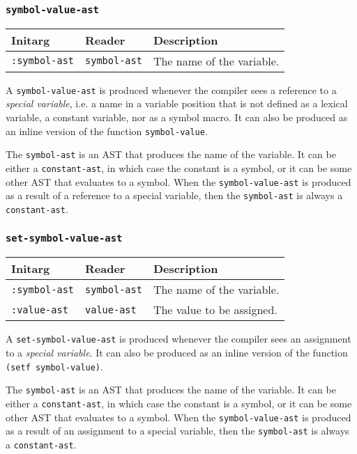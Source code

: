 \subsubsection{\texttt{symbol-value-ast}}
\label{symbol-value-ast}

\begin{tabular}{|l|l|l|}
\hline
Initarg & Reader & Description\\
\hline\hline
\texttt{:symbol-ast} & \texttt{symbol-ast} & The name of the variable.\\  
\hline
\end{tabular}

A \texttt{symbol-value-ast} is produced whenever the compiler sees a
reference to a \emph{special variable}, i.e. a name in a variable
position that is not defined as a lexical variable, a constant
variable, nor as a symbol macro.  It can also be produced as an inline
version of the function \texttt{symbol-value}.

The \texttt{symbol-ast} is an AST that produces the name of the
variable.  It can be either a \texttt{constant-ast}, in which case the
constant is a symbol, or it can be some other AST that evaluates to a
symbol.  When the \texttt{symbol-value-ast} is produced as a result of
a reference to a special variable, then the \texttt{symbol-ast} is
always a \texttt{constant-ast}.

\subsubsection{\texttt{set-symbol-value-ast}}
\label{set-symbol-value-ast}

\begin{tabular}{|l|l|l|}
\hline
Initarg & Reader & Description\\
\hline\hline
\texttt{:symbol-ast} & \texttt{symbol-ast} & The name of the variable.\\  
\hline
\texttt{:value-ast} & \texttt{value-ast} & The value to be assigned.\\  
\hline
\end{tabular}

A \texttt{set-symbol-value-ast} is produced whenever the compiler sees
an assignment to a \emph{special variable}.  It can also be produced
as an inline version of the function \texttt{(setf symbol-value)}.

The \texttt{symbol-ast} is an AST that produces the name of the
variable.  It can be either a \texttt{constant-ast}, in which case the
constant is a symbol, or it can be some other AST that evaluates to a
symbol.  When the \texttt{symbol-value-ast} is produced as a result of
an assignment to a special variable, then the \texttt{symbol-ast} is
always a \texttt{constant-ast}.

